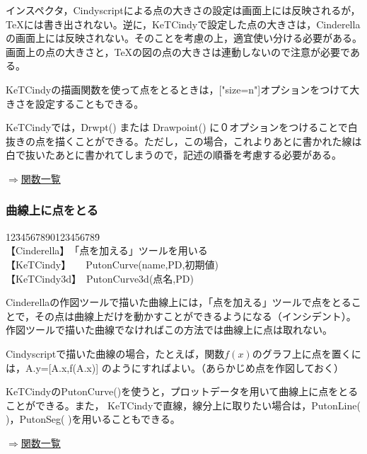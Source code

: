 \documentclass[papersize,a4paper,12pt,uplatex]{jsarticle}
\begin{document}
インスペクタ，Cindyscriptによる点の大きさの設定は画面上には反映されるが，TeXには書き出されない。逆に，KeTCindyで設定した点の大きさは，Cinderellaの画面上には反映されない。そのことを考慮の上，適宜使い分ける必要がある。画面上の点の大きさと，TeXの図の点の大きさは連動しないので注意が必要である。

KeTCindyの描画関数を使って点をとるときは，["size=n"]オプションをつけて大きさを設定することもできる。

KeTCindyでは，Drwpt() または Drawpoint() に０オプションをつけることで白抜きの点を描くことができる。ただし，この場合，これよりあとに書かれた線は白で抜いたあとに書かれてしまうので，記述の順番を考慮する必要がある。\\
\begin{flushright} \hyperlink{functionlist3d}{$\Rightarrow$関数一覧}\end{flushright}

\subsubsection{曲線上に点をとる}

\begin{tabbing}
12\=34567890123456789\=\kill\\

\>【Cinderella】　\>「点を加える」ツールを用いる\\ 
\>【KeTCindy】　　\>PutonCurve(name,PD,初期値)\\
\>【KeTCindy3d】　\>PutonCurve3d(点名,PD)\\
\end{tabbing}

Cinderellaの作図ツールで描いた曲線上には，「点を加える」ツールで点をとることで，その点は曲線上だけを動かすことができるようになる（インシデント）。作図ツールで描いた曲線でなければこの方法では曲線上に点は取れない。

Cindyscriptで描いた曲線の場合，たとえば，関数$f(x)$のグラフ上に点を置くには，A.y=[A.x,f(A.x)] のようにすればよい。（あらかじめ点を作図しておく）

KeTCindyのPutonCurve()を使うと，プロットデータを用いて曲線上に点をとることができる。また，
KeTCindyで直線，線分上に取りたい場合は，PutonLine( )，PutonSeg( )を用いることもできる。\\
\begin{flushright} \hyperlink{functionlist3d}{$\Rightarrow$関数一覧}\end{flushright}
 
\end{document}
